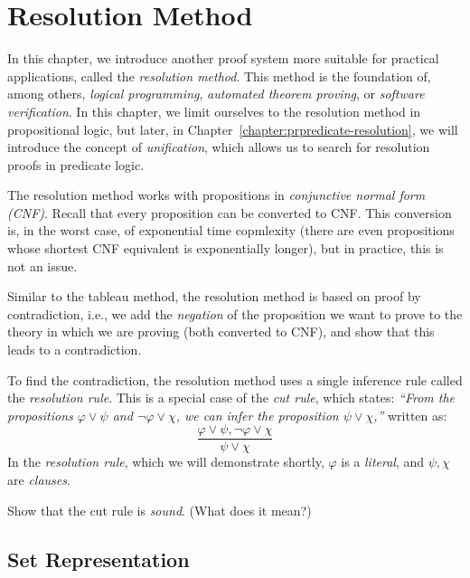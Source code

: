 \chapter{Resolution Method}\label{chapter:propositional-resolution}

In this chapter, we introduce another proof system more suitable for practical applications, called the \emph{resolution method}. This method is the foundation of, among others, \emph{logical programming}, \emph{automated theorem proving}, or \emph{software verification}. In this chapter, we limit ourselves to the resolution method in propositional logic, but later, in Chapter~\ref{chapter:prpredicate-resolution}, we will introduce the concept of \emph{unification}, which allows us to search for resolution proofs in predicate logic.

The resolution method works with propositions in \emph{conjunctive normal form (CNF)}. Recall that every proposition can be converted to CNF. This conversion is, in the worst case, of exponential time copmlexity (there are even propositions whose shortest CNF equivalent is exponentially longer), but in practice, this is not an issue.

Similar to the tableau method, the resolution method is based on proof by contradiction, i.e., we add the \emph{negation} of the proposition we want to prove to the theory in which we are proving (both converted to CNF), and show that this leads to a contradiction.

To find the contradiction, the resolution method uses a single inference rule called the \emph{resolution rule}. This is a special case of the \emph{cut rule}, which states: \emph{``From the propositions $\varphi \lor \psi$ and $\neg \varphi \lor \chi$, we can infer the proposition $\psi \lor \chi$,''} written as:
$$
\frac{\varphi \lor \psi, \neg \varphi \lor \chi}{\psi \lor \chi}
$$
In the \emph{resolution rule}, which we will demonstrate shortly, $\varphi$ is a \emph{literal}, and $\psi, \chi$ are \emph{clauses}.

\begin{exercise}
Show that the cut rule is \emph{sound}. (What does it mean?)
\end{exercise}

\section{Set Representation}


